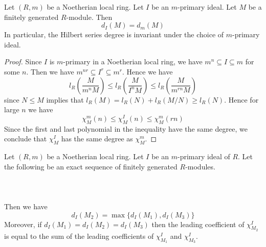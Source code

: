 \documentclass[a4paper]{article}
\begin{document}
\begin{prp}{}{} Let $(R,m)$ be a Noetherian local ring. Let $I$ be an $m$-primary ideal. Let $M$ be a finitely generated $R$-module. Then $$d_I(M)=d_m(M)$$ In particular, the Hilbert series degree is invariant under the choice of $m$-primary ideal. 
\begin{proof}
Since $I$ is $m$-primary in a Noetherian local ring, we have $m^n\subseteq I\subseteq m$ for some $n$. Then we have $m^{nr}\subseteq I^r\subseteq m^r$. Hence we have $$l_R\left(\frac{M}{m^nM}\right)\leq l_R\left(\frac{M}{I^nM}\right)\leq l_R\left(\frac{M}{m^{rn}M}\right)$$ since $N\leq M$ implies that $l_R(M)=l_R(N)+l_R(M/N)\geq l_R(N)$. Hence for large $n$ we have $$\chi_M^m(n)\leq\chi_M^I(n)\leq\chi_M^m(rn)$$ Since the first and last polynomial in the inequality have the same degree, we conclude that $\chi_M^I$ has the same degree as $\chi_M^m$. 
\end{proof}
\end{prp}

\begin{prp}{}{} Let $(R,m)$ be a Noetherian local ring. Let $I$ be an $m$-primary ideal of $R$. Let the following be an exact sequence of finitely generated $R$-modules. \\~\\
\\~\\
Then we have $$d_I(M_2)=\max\{d_I(M_1),d_I(M_3)\}$$ Moreover, if $d_I(M_1)=d_I(M_2)=d_I(M_3)$ then the leading coefficient of $\chi_{M_2}^I$ is equal to the sum of the leading coefficients of $\chi_{M_1}^I$ and $\chi_{M_3}^I$. 
\end{prp}
\end{document}
